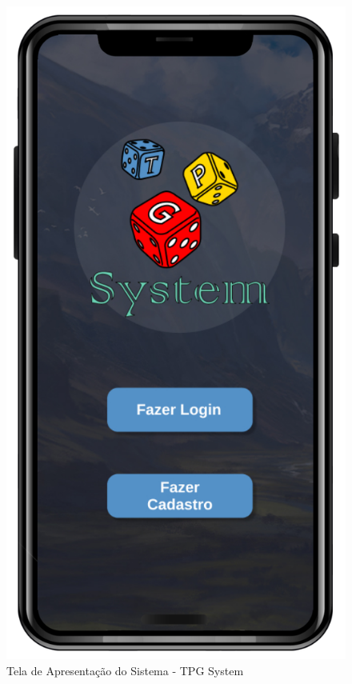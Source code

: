 \begin{figure}[!h]
\centering
\caption{Tela de Apresentação do Sistema - TPG System}%
\label{fig:Tela1}
\includegraphics[scale=0.20]{Illustrations/Tela1.png}
\end{figure}

